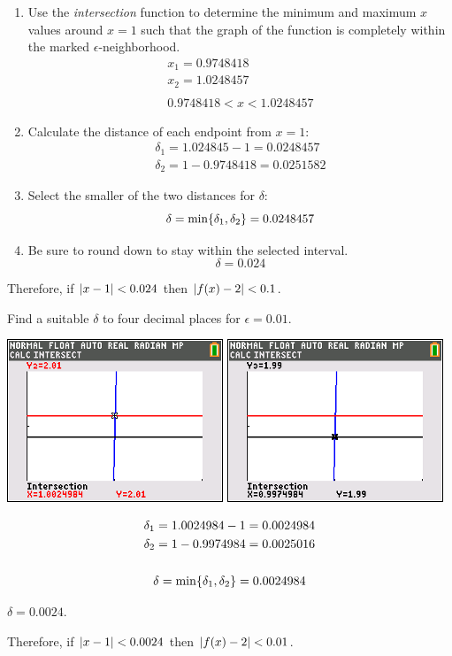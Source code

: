 \documentclass[letterpaper,12pt,fleqn]{article}
\newcommand{\e}{\epsilon}
\renewcommand{\d}{\delta}
\begin{document}
\begin{example}
\begin{enumerate}
  \item Use the \emph{intersection} function to determine the minimum and maximum \(x\) values around \(x=1\) such
    that the graph of the function is completely within the marked \(\e\)-neighborhood.
    \begin{gather*}
      x_1=0.9748418 \\
      x_2=1.0248457 \\
      \\
      0.9748418<x<1.0248457
    \end{gather*}
  \item Calculate the distance of each endpoint from \(x=1\):
    \begin{gather*}
      \d_1=1.024845-1=0.0248457 \\
      \d_2=1-0.9748418=0.0251582
    \end{gather*}
  \item Select the smaller of the two distances for \(\d\):
    \[\d=\min\set{\d_1,\d_2}=0.0248457\]
  \item Be sure to round down to stay within the selected interval.
    \[\d=0.024\]
  \end{enumerate}

  Therefore, if \(\lvert x-1\rvert<0.024\) then \(\lvert f(x)-2\rvert<0.1\).

  \bigskip

  Find a suitable \(\d\) to four decimal places for \(\e=0.01\).

  \bigskip

  \includegraphics[scale=0.75]{poly001a}\qquad
  \includegraphics[scale=0.75]{poly001b}

  \begin{gather*}
    \d_1=1.0024984-1=0.0024984 \\
    \d_2=1-0.9974984=0.0025016 \\
    \\
    \d=\min\set{\d_1,\d_2}=0.0024984
  \end{gather*}

  \(\d=0.0024\).

  Therefore, if \(\lvert x-1\rvert<0.0024\) then \(\lvert f(x)-2\rvert<0.01\).
\end{example}
\end{document}
